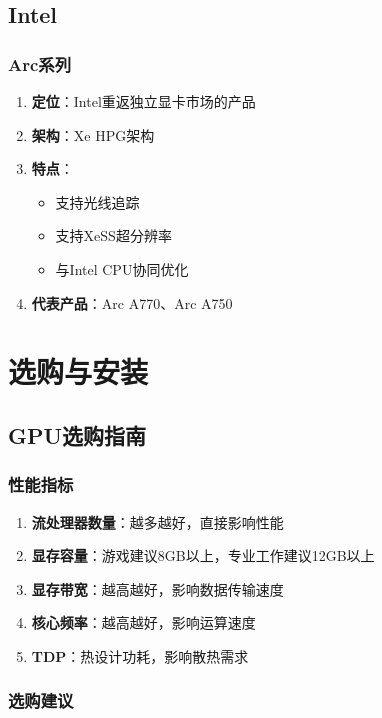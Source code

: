 \documentclass[12pt,UTF8]{ctexbook}
\begin{document}
\chapter{Intel}

\section{Arc系列}

\begin{enumerate}
    \item \textbf{定位}：Intel重返独立显卡市场的产品
    \item \textbf{架构}：Xe HPG架构
    \item \textbf{特点}：
    \begin{itemize}[leftmargin=2em]
        \item 支持光线追踪
        \item 支持XeSS超分辨率
        \item 与Intel CPU协同优化
    \end{itemize}
    \item \textbf{代表产品}：Arc A770、Arc A750
\end{enumerate}

\part{选购与安装}

\chapter{GPU选购指南}

\section{性能指标}

\begin{enumerate}
    \item \textbf{流处理器数量}：越多越好，直接影响性能
    \item \textbf{显存容量}：游戏建议8GB以上，专业工作建议12GB以上
    \item \textbf{显存带宽}：越高越好，影响数据传输速度
    \item \textbf{核心频率}：越高越好，影响运算速度
    \item \textbf{TDP}：热设计功耗，影响散热需求
\end{enumerate}

\section{选购建议}
\end{document}
